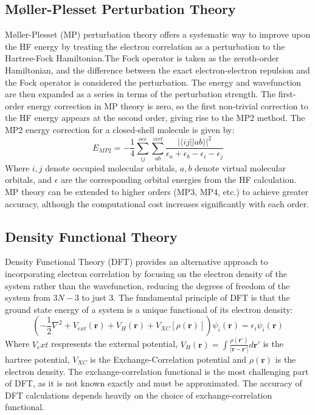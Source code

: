 \subsection{Møller-Plesset Perturbation Theory}
Møller-Plesset (MP) perturbation theory offers a systematic way to improve upon the HF energy by treating the electron correlation as a perturbation to the Hartree-Fock Hamiltonian.The Fock operator is taken as the zeroth-order Hamiltonian, and the difference between the exact electron-electron repulsion and the Fock operator is considered the perturbation. The energy and wavefunction are then expanded as a series in terms of the perturbation strength. The first-order energy correction in MP theory is zero, so the first non-trivial correction to the HF energy appears at the second order, giving rise to the MP2 method. The MP2 energy correction for a closed-shell molecule is given by:
\begin{equation} \label{eq:MP2}
    E_{MP2} = - \frac{1}{4} \sum_{ij}^{occ} \sum_{ab}^{virt} \frac{|\langle i j || a b \rangle|^2}{\epsilon_a + \epsilon_b - \epsilon_i - \epsilon_j}
\end{equation}
Where $i,j$ denote occupied molecular orbitals, $a,b$ denote virtual molecular orbitals, and $\epsilon$ are the corresponding orbital energies from the HF calculation. MP theory can be extended to higher orders (MP3, MP4, etc.) to achieve greater accuracy, although the computational cost increases significantly with each order.

\subsection{Density Functional Theory}
Density Functional Theory (DFT) provides an alternative approach to incorporating electron correlation by focusing on the electron density of the system rather than the wavefunction, reducing the degrees of freedom of the system from $3N-3$ to just $3$. The fundamental principle of DFT is that the ground state energy of a system is a unique functional of its electron density:
\begin{equation}\label{eq:KSDFT}
    \left( -\frac{1}{2} \nabla^2 + V_{ext}(\mathbf{r}) + V_H(\mathbf{r}) + V_{XC}[\rho(\mathbf{r})] \right) \psi_i(\mathbf{r}) = \epsilon_i \psi_i(\mathbf{r})
\end{equation}
Where $V_ext$ respresents the external potential, $V_H(\mathbf{r}) = \int \frac{\rho(\mathbf{r}')}{|\mathbf{r} - \mathbf{r}'|} d\mathbf{r}'$ is the hartree potential, $V_{XC}$ is the Exchange-Correlation potential and $\rho(\mathbf{r})$ is the electron density. The exchange-correlation functional is the most challenging part of DFT, as it is not known exactly and must be approximated. The accuracy of DFT calculations depends heavily on the choice of exchange-correlation functional.

